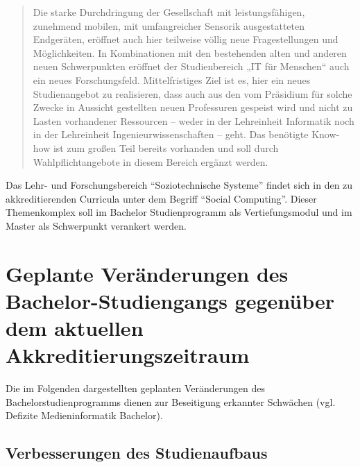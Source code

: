 \begin{quote}
Die starke Durchdringung der Gesellschaft mit leistungsfähigen,
zunehmend mobilen, mit umfangreicher Sensorik ausgestatteten Endgeräten,
eröffnet auch hier teilweise völlig neue Fragestellungen und
Möglichkeiten. In Kombinationen mit den bestehenden alten und anderen
neuen Schwerpunkten eröffnet der Studienbereich „IT für Menschen`` auch
ein neues Forschungsfeld. Mittelfristiges Ziel ist es, hier ein neues
Studienangebot zu realisieren, dass auch aus den vom Präsidium für
solche Zwecke in Aussicht gestellten neuen Professuren gespeist wird und
nicht zu Lasten vorhandener Ressourcen -- weder in der Lehreinheit
Informatik noch in der Lehreinheit Ingenieurwissenschaften -- geht. Das
benötigte Know-how ist zum großen Teil bereits vorhanden und soll durch
Wahlpflichtangebote in diesem Bereich ergänzt werden.
\end{quote}

Das Lehr- und Forschungsbereich ``Soziotechnische Systeme'' findet sich
in den zu akkreditierenden Curricula unter dem Begriff ``Social
Computing''. Dieser Themenkomplex soll im Bachelor Studienprogramm als
Vertiefungsmodul und im Master als Schwerpunkt verankert werden.

\section{Geplante Veränderungen des Bachelor-Studiengangs gegenüber
dem aktuellen
Akkreditierungszeitraum}\label{geplante-veruxe4nderungen-des-bachelor-studiengangs-gegenuxfcber-dem-aktuellen-akkreditierungszeitraum}

Die im Folgenden dargestellten geplanten Veränderungen des
Bachelorstudienprogramms dienen zur Beseitigung erkannter Schwächen
(vgl. Defizite Medieninformatik Bachelor).

\subsection{Verbesserungen des
Studienaufbaus}\label{verbesserungen-des-studienaufbaus}

